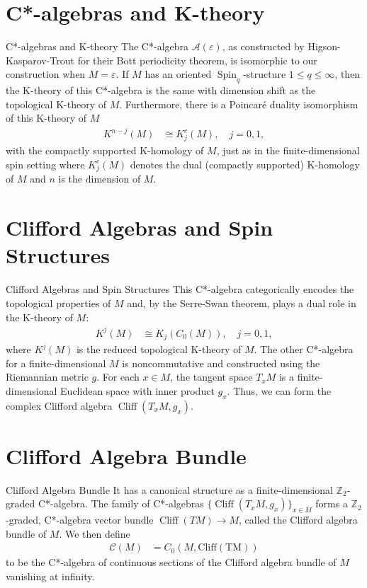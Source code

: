 \documentclass{beamer}
\begin{document}
\section{C*-algebras and K-theory}
\begin{frame}{C*-algebras and K-theory}
       The C*-algebra \(\mathcal{A}(\varepsilon)\), as constructed by Higson-Kasparov-Trout for their Bott periodicity theorem, is isomorphic to our construction when \(M=\varepsilon\). If \(M\) has an oriented \(\operatorname{Spin}_{q}\)-structure \(1 \leq q \leq \infty\), then the K-theory of this C*-algebra is the same with dimension shift as the topological K-theory of \(M\). Furthermore, there is a Poincaré duality isomorphism of this K-theory of \(M\)
        \begin{align*}
            K^{n-j}(M) &\cong K_{j}^{c}(M), \quad j=0,1,
        \end{align*}
        with the compactly supported K-homology of \(M\), just as in the finite-dimensional spin setting where \(K_{j}^{c}(M)\) denotes the dual (compactly supported) K-homology of \(M\) and \(n\) is the dimension of \(M\).
\end{frame}
\section{Clifford Algebras and Spin Structures}
\begin{frame}{Clifford Algebras and Spin Structures}
    This C*-algebra categorically encodes the topological properties of \(M\) and, by the Serre-Swan theorem, plays a dual role in the K-theory of \(M\):
        \begin{align*}
            K^{j}(M) &\cong K_{j}(C_{0}(M)), \quad j=0,1,
        \end{align*}
        where \(K^{j}(M)\) is the reduced topological K-theory of \(M\). The other C*-algebra for a finite-dimensional \(M\) is noncommutative and constructed using the Riemannian metric \(g\). For each \(x \in M\), the tangent space \(T_{x}M\) is a finite-dimensional Euclidean space with inner product \(g_{x}\). Thus, we can form the complex Clifford algebra \(\operatorname{Cliff}(T_{x}M,g_{x})\).
\end{frame}
\section{Clifford Algebra Bundle}
\begin{frame}{Clifford Algebra Bundle}
    It has a canonical structure as a finite-dimensional \(\mathbb{Z}_{2}\)-graded C*-algebra. The family of C*-algebras \(\{\operatorname{Cliff}(T_{x}M,g_{x})\}_{x \in M}\) forms a \(\mathbb{Z}_{2}\)-graded, C*-algebra vector bundle \(\operatorname{Cliff}(TM) \to M\), called the Clifford algebra bundle of \(M\). We then define
        \begin{align*}
            \mathcal{C}(M) &= C_{0}(M, \operatorname{Cliff(TM)})
        \end{align*}
        to be the C*-algebra of continuous sections of the Clifford algebra bundle of \(M\) vanishing at infinity.
\end{frame}
\end{document}
